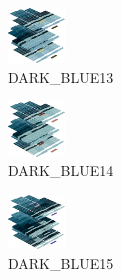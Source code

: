 \hspace{0.1cm}
\begin{minipage}[b]{0.15\linewidth}
\begin{figure}[H]                                                          
  \centering                                                             
  \begin{adjustbox}{width=1.5cm,center}                                   
  \includegraphics[width=1.5cm]{src/colorspace_colourflow/flows/colourflow_157-45.png}%
  \end{adjustbox}                                                        
\caption*{DARK\_BLUE13}                                           
\end{figure}                                                               
\end{minipage}
\hspace{0.1cm}
\begin{minipage}[b]{0.15\linewidth}
\begin{figure}[H]                                                          
  \centering                                                             
  \begin{adjustbox}{width=1.5cm,center}                                   
  \includegraphics[width=1.5cm]{src/colorspace_colourflow/flows/colourflow_158-45.png}%
  \end{adjustbox}                                                        
\caption*{DARK\_BLUE14}                                           
\end{figure}                                                               
\end{minipage}
\hspace{0.1cm}
\begin{minipage}[b]{0.15\linewidth}
\begin{figure}[H]                                                          
  \centering                                                             
  \begin{adjustbox}{width=1.5cm,center}                                   
  \includegraphics[width=1.5cm]{src/colorspace_colourflow/flows/colourflow_159-45.png}%
  \end{adjustbox}                                                        
\caption*{DARK\_BLUE15}                                           
\end{figure}                                                               
\end{minipage}
